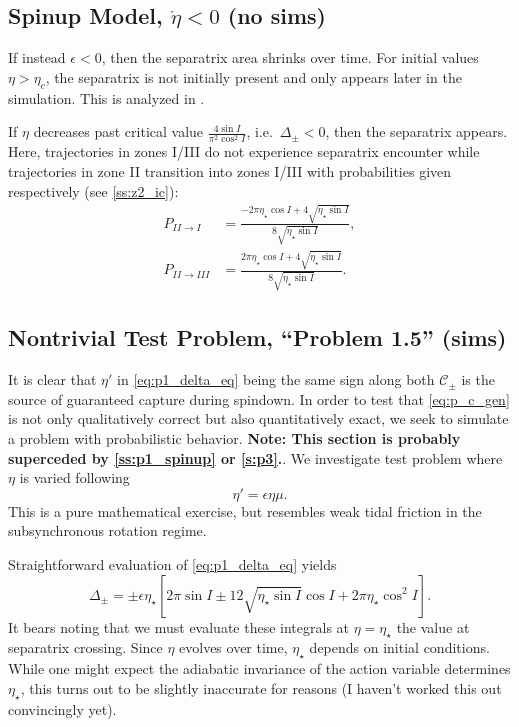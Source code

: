\documentclass[
        fleqn,
        usenatbib,
    ]{mnras}
\newcommand*{\s}[1]{\left[#1\right]}
\begin{document}
\subsection{Spinup Model, $\dot{\eta} < 0$ (no sims)}\label{ss:p1_spinup}

If instead $\epsilon < 0$, then the separatrix area shrinks over time. For
initial values $\eta > \eta_c$, the separatrix is not initially present and only
appears later in the simulation. This is analyzed in \citep{anderson2018teeter}.

If $\eta$ decreases past critical value $\frac{4\sin I}{\pi^2 \cos^2 I}$, i.e.\
$\Delta_{\pm} < 0$, then the separatrix appears. Here, trajectories in zones
I/III do not experience separatrix encounter while trajectories in zone II
transition into zones I/III with probabilities given respectively (see
\autoref{ss:z2_ic}):
\begin{equation}
    \begin{split}
        P_{II \to I} &= \frac{-2\pi \eta_\star \cos I + 4\sqrt{\eta_\star \sin I}}
            {8\sqrt{\eta_\star \sin I}}, \\
        P_{II \to III} &= \frac{2\pi \eta_\star \cos I + 4\sqrt{\eta_\star \sin
            I}} {8\sqrt{\eta_\star \sin I}}.
    \end{split}
\end{equation}

\subsection{Nontrivial Test Problem, ``Problem 1.5'' (sims)}\label{ss:p1_toy}

It is clear that $\eta'$ in \autoref{eq:p1_delta_eq} being the same sign along
both $\mathcal{C}_{\pm}$ is the source of guaranteed capture during
spindown. In order to test that \autoref{eq:p_c_gen} is not only qualitatively
correct but also quantitatively exact, we seek to simulate a problem with
probabilistic behavior. \textbf{Note: This section is probably superceded by
\autoref{ss:p1_spinup} or \autoref{s:p3}.}. We investigate test problem where
$\eta$ is varied following
\begin{equation}
    \eta' = \epsilon \eta \mu.
\end{equation}
This is a pure mathematical exercise, but resembles weak tidal friction in the
subsynchronous rotation regime.

Straightforward evaluation of \autoref{eq:p1_delta_eq} yields
\begin{equation}
    \Delta_{\pm} = \pm \epsilon \eta_\star \s{
        2\pi \sin I \pm 12 \sqrt{\eta_\star \sin I}\cos I
            + 2\pi \eta_\star \cos^2 I}.
\end{equation}
It bears noting that we must evaluate these integrals at $\eta = \eta_\star$ the
value at separatrix crossing. Since $\eta$ evolves over time, $\eta_{\star}$
depends on initial conditions. While one might expect the adiabatic invariance
of the action variable determines $\eta_\star$, this turns out to be slightly
inaccurate for reasons (I haven't worked this out convincingly yet).
\end{document}
